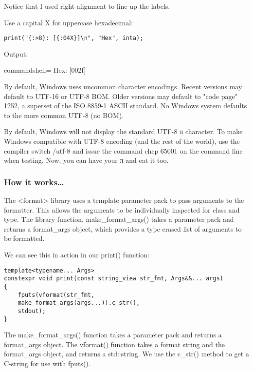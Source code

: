 \begin{itemize}
Notice that I used right alignment to line up the labels.

Use a capital X for uppercase hexadecimal:

\begin{lstlisting}[style=styleCXX]
print("{:>8}: [{:04X}]\n", "Hex", inta);
\end{lstlisting}

Output:

\begin{tcblisting}{commandshell={}}
    Hex: [002f]
\end{tcblisting}

\begin{tcolorbox}[colback=gray!5!white,colframe=gray!75!black,title=Tip]
By default, Windows uses uncommon character encodings. Recent versions may default to UTF-16 or UTF-8 BOM. Older versions may default to "code page" 1252, a superset of the ISO 8859-1 ASCII standard. No Windows system defaults to the more common UTF-8 (no BOM).

By default, Windows will not display the standard UTF-8 π character. To make Windows compatible with UTF-8 encoding (and the rest of the world), use the compiler switch /utf-8 and issue the command chcp 65001 on the command line when testing. Now, you can have your π and eat it too.
\end{tcolorbox}
	
\end{itemize}

\subsubsection{How it works…}

The <format> library uses a template parameter pack to pass arguments to the formatter. This allows the arguments to be individually inspected for class and type. The library function, make\_format\_args() takes a parameter pack and returns a format\_args object, which provides a type erased list of arguments to be formatted.

We can see this in action in our print() function:

\begin{lstlisting}[style=styleCXX]
template<typename... Args>
constexpr void print(const string_view str_fmt, Args&&... args)
{
	fputs(vformat(str_fmt,
	make_format_args(args...)).c_str(),
	stdout);
}
\end{lstlisting}

The make\_format\_args() function takes a parameter pack and returns a format\_args object. The vformat() function takes a format string and the format\_args object, and returns a std::string. We use the c\_str() method to get a C-string for use with fputs().

